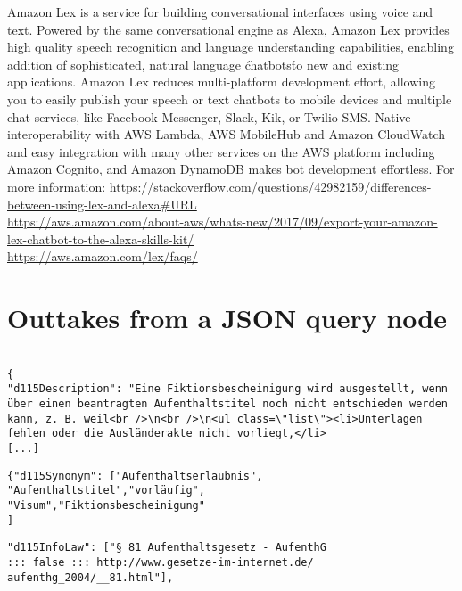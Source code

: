 Amazon Lex is a service for building conversational interfaces using voice and text. Powered by the same conversational engine as Alexa, Amazon Lex provides high quality speech recognition and language understanding capabilities, enabling addition of sophisticated, natural language \'chatbots\' to new and existing applications. Amazon Lex reduces multi-platform development effort, allowing you to easily publish your speech or text chatbots to mobile devices and multiple chat services, like Facebook Messenger, Slack, Kik, or Twilio SMS. Native interoperability with AWS Lambda, AWS MobileHub and Amazon CloudWatch and easy integration with many other services on the AWS platform including Amazon Cognito, and Amazon DynamoDB makes bot development effortless.
For more information: \url{https://stackoverflow.com/questions/42982159/differences-between-using-lex-and-alexa#URL}\\
\url{https://aws.amazon.com/about-aws/whats-new/2017/09/export-your-amazon-lex-chatbot-to-the-alexa-skills-kit/}\\
\url{https://aws.amazon.com/lex/faqs/}









\clearpage


\section*{Outtakes from a JSON query node}
\label{query:dl}

\begin{verbatim}

{
"d115Description": "Eine Fiktionsbescheinigung wird ausgestellt, wenn über einen beantragten Aufenthaltstitel noch nicht entschieden werden kann, z. B. weil<br />\n<br />\n<ul class=\"list\"><li>Unterlagen fehlen oder die Ausländerakte nicht vorliegt,</li>
[...]
\end{verbatim}

\begin{verbatim}
{"d115Synonym": ["Aufenthaltserlaubnis",
"Aufenthaltstitel","vorläufig", 
"Visum","Fiktionsbescheinigung"
]
\end{verbatim}

\begin{verbatim}
"d115InfoLaw": ["§ 81 Aufenthaltsgesetz - AufenthG 
::: false ::: http://www.gesetze-im-internet.de/
aufenthg_2004/__81.html"],
\end{verbatim}

